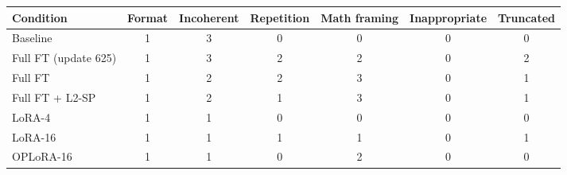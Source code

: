 \begin{tabular}{lcccccc}\toprule Condition & Format & Incoherent & Repetition & Math framing & Inappropriate & Truncated \\ \midrule
Baseline & 1 & 3 & 0 & 0 & 0 & 0 \\
Full FT (update 625) & 1 & 3 & 2 & 2 & 0 & 2 \\
Full FT & 1 & 2 & 2 & 3 & 0 & 1 \\
Full FT + L2-SP & 1 & 2 & 1 & 3 & 0 & 1 \\
LoRA-4 & 1 & 1 & 0 & 0 & 0 & 0 \\
LoRA-16 & 1 & 1 & 1 & 1 & 0 & 1 \\
OPLoRA-16 & 1 & 1 & 0 & 2 & 0 & 0 \\
\bottomrule\end{tabular}
